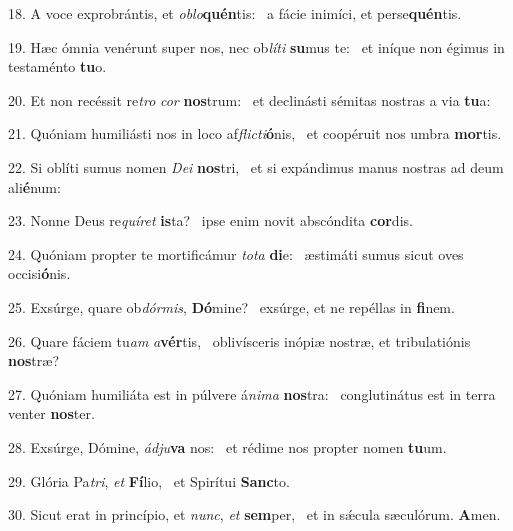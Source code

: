 18. A voce exprobrántis, et \textit{ob}\textit{lo}\textbf{quén}tis: \ast\  a fácie inimíci, et perse\textbf{quén}tis.\

19. Hæc ómnia venérunt super nos, nec ob\textit{lí}\textit{ti} \textbf{su}mus te: \ast\  et iníque non égimus in testaménto \textbf{tu}o.\

20. Et non recéssit re\textit{tro} \textit{cor} \textbf{nos}trum: \ast\  et declinásti sémitas nostras a via \textbf{tu}a:\

21. Quóniam humiliásti nos in loco af\textit{flic}\textit{ti}\textbf{ó}nis, \ast\  et coopéruit nos umbra \textbf{mor}tis.\

22. Si oblíti sumus nomen \textit{De}\textit{i} \textbf{nos}tri, \ast\  et si expándimus manus nostras ad deum ali\textbf{é}num:\

23. Nonne Deus re\textit{quí}\textit{ret} \textbf{is}ta? \ast\  ipse enim novit abscóndita \textbf{cor}dis.\

24. Quóniam propter te mortificámur \textit{to}\textit{ta} \textbf{di}e: \ast\  æstimáti sumus sicut oves occisi\textbf{ó}nis.\

25. Exsúrge, quare ob\textit{dór}\textit{mis}, \textbf{Dó}mine? \ast\  exsúrge, et ne repéllas in \textbf{fi}nem.\

26. Quare fáciem tu\textit{am} \textit{a}\textbf{vér}tis, \ast\  oblivísceris inópiæ nostræ, et tribulatiónis \textbf{nos}træ?\

27. Quóniam humiliáta est in púlvere á\textit{ni}\textit{ma} \textbf{nos}tra: \ast\  conglutinátus est in terra venter \textbf{nos}ter.\

28. Exsúrge, Dómine, \textit{ád}\textit{ju}\textbf{va} nos: \ast\  et rédime nos propter nomen \textbf{tu}um.\

29. Glória Pa\textit{tri}, \textit{et} \textbf{Fí}lio, \ast\  et Spirítui \textbf{Sanc}to.\

30. Sicut erat in princípio, et \textit{nunc}, \textit{et} \textbf{sem}per, \ast\  et in sǽcula sæculórum. \textbf{A}men.\

